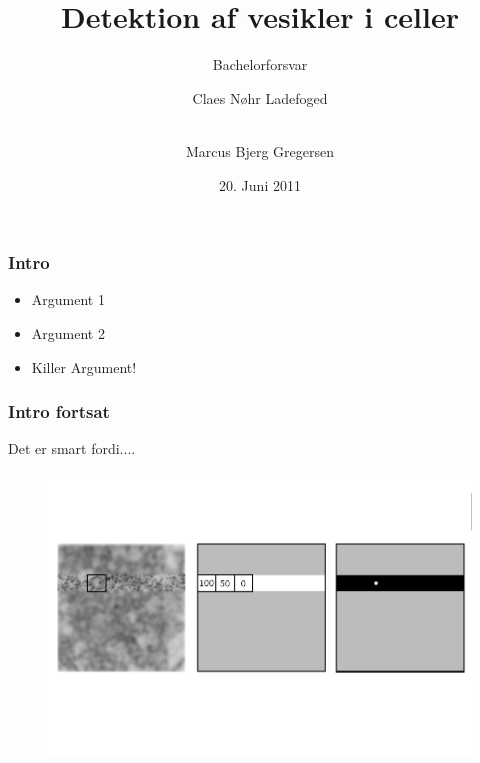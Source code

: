 \documentclass[12pt,t]{beamer}
\title{Detektion af vesikler i celler}
\subtitle{Bachelorforsvar}
\author{Claes Nøhr Ladefoged \and \\
Marcus Bjerg Gregersen}
\institute{Datalogisk Institut}
\date[]{20. Juni 2011}
\begin{document}
\frame[plain]{\titlepage}

\begin{frame}
\frametitle{Intro}
\begin{itemize}
	\item Argument 1 
	\item Argument 2
	\item Killer Argument!
\end{itemize}
\end{frame}

\begin{frame}
\frametitle{Intro fortsat}
Det er smart fordi....
\begin{figure}[H]
\includegraphics{9.png}
\end{figure}
\end{frame}
\end{document}
